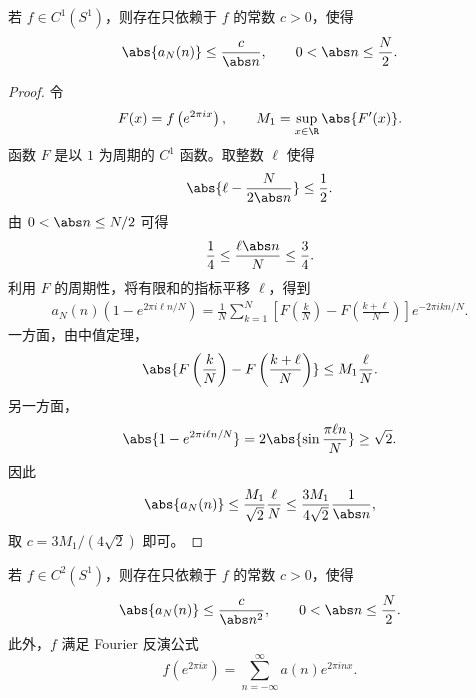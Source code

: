 \begin{proposition}\label{prop:finite-circle-fourier-C1-decay}
	若 $f\in C^1(S^1)$，则存在只依赖于 $f$ 的常数 $c>0$，使得
	\[
	\abs{a_N(n)}\leq\frac{c}{\abs n},
	\qquad 0<\abs n\leq\frac N2.
	\]
\end{proposition}

\begin{proof}
	令
	\[
	F(x)=f\left(e^{2\pi ix}\right),
	\qquad
	M_1=\sup_{x\in\R}\abs{F'(x)}.
	\]
	函数 $F$ 是以 $1$ 为周期的 $C^1$ 函数。取整数 $\ell$ 使得
	\[
	\abs{\ell-\frac{N}{2\abs n}}\leq\frac12.
	\]
	由 $0<\abs n\leq N/2$ 可得
	\[
	\frac14\leq\frac{\ell\abs n}{N}\leq\frac34.
	\]
	利用 $F$ 的周期性，将有限和的指标平移 $\ell$，得到
	\[
	\begin{aligned}
	a_N(n)\left(1-e^{2\pi i\ell n/N}\right)
	=\frac1N\sum_{k=1}^N
	\left[F\left(\frac{k}{N}\right)
	-F\left(\frac{k+\ell}{N}\right)\right]
	e^{-2\pi ikn/N}.
	\end{aligned}
	\]
	一方面，由中值定理，
	\[
	\abs{F\left(\frac{k}{N}\right)
	-F\left(\frac{k+\ell}{N}\right)}
	\leq M_1\frac{\ell}{N}.
	\]
	另一方面，
	\[
	\abs{1-e^{2\pi i\ell n/N}}
	=2\abs{\sin\frac{\pi\ell n}{N}}
	\geq\sqrt2.
	\]
	因此
	\[
	\abs{a_N(n)}
	\leq\frac{M_1}{\sqrt2}\frac{\ell}{N}
	\leq\frac{3M_1}{4\sqrt2}\frac1{\abs n},
	\]
	取 $c=3M_1/(4\sqrt2)$ 即可。
\end{proof}

\begin{proposition}\label{prop:finite-circle-fourier-C2-decay-inversion}
	若 $f\in C^2(S^1)$，则存在只依赖于 $f$ 的常数 $c>0$，使得
	\[
	\abs{a_N(n)}\leq\frac{c}{\abs n^2},
	\qquad 0<\abs n\leq\frac N2.
	\]
	此外，$f$ 满足 Fourier 反演公式
	\[
	f\left(e^{2\pi ix}\right)
	=\sum_{n=-\infty}^{\infty}a(n)e^{2\pi inx}.
	\]
\end{proposition}

